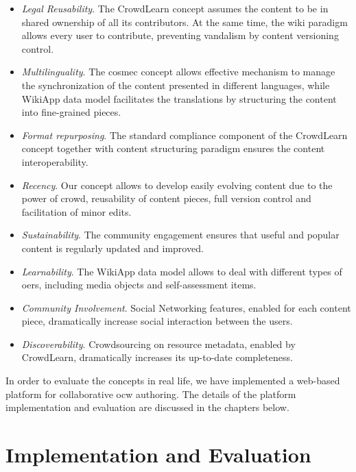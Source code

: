 \documentclass[PhD, Submit, ngerman,UKenglish,table]{scrbook}
\begin{document}
\begin{itemize}
\item \emph{Legal Reusability}. The CrowdLearn concept assumes the content to be in shared ownership of all its contributors. At the same time, the wiki paradigm allows every user to contribute, preventing vandalism by content versioning control.
\item \emph{Multilinguality}. The \gls{cosmec} concept allows effective mechanism to manage the synchronization of the content presented in different languages, while WikiApp data model facilitates the translations by structuring the content into fine-grained pieces.
\item \emph{Format repurposing}. The standard compliance component of the CrowdLearn concept together with content structuring paradigm ensures the content interoperability.
\item \emph{Recency}. Our concept allows to develop easily evolving content due to the power of crowd, reusability of content pieces, full version control and facilitation of minor edits.
\item \emph{Sustainability}. The community engagement ensures that useful and popular content is regularly updated and improved.
\item \emph{Learnability}. The WikiApp data model allows to deal with different types of \gls{oer}s, including media objects and self-assessment items.
\item \emph{Community Involvement}. Social Networking features, enabled for each content piece, dramatically increase social interaction between the users. 
\item \emph{Discoverability}. Crowdsourcing on resource metadata, enabled by CrowdLearn, dramatically increases its up-to-date completeness. 
\end{itemize}





In order to evaluate the concepts in real life, we have implemented a web-based platform for collaborative \gls{ocw} authoring.
The details of the platform implementation and evaluation are discussed in the chapters below. 

\chapter{Implementation and Evaluation}
\label{chapter:implementation}
\end{document}
